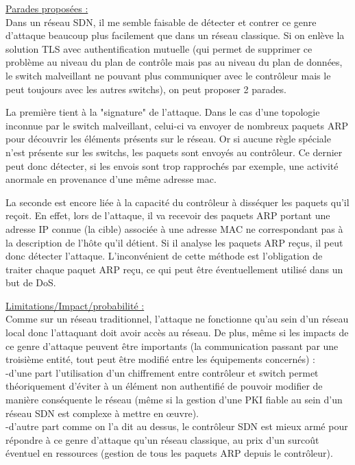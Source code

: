 \underline{Parades proposées :}\\
Dans un réseau SDN, il me semble faisable de détecter et contrer ce genre d'attaque beaucoup plus facilement que dans un réseau classique. Si on enlève la solution TLS avec authentification mutuelle (qui permet de supprimer ce problème au niveau du plan de contrôle mais pas au niveau du plan de données, le switch malveillant ne pouvant plus communiquer avec le contrôleur mais le peut toujours avec les autres switchs), on peut proposer 2 parades.

La première tient à la "signature" de l'attaque. Dans le cas d'une topologie inconnue par le switch malveillant, celui-ci va envoyer de nombreux paquets ARP pour découvrir les éléments présents sur le réseau. Or si aucune règle spéciale n'est présente sur les switchs, les paquets sont envoyés au contrôleur. Ce dernier peut donc détecter, si les envois sont trop rapprochés par exemple, une activité anormale en provenance d'une même adresse mac.

La seconde est encore liée à la capacité du contrôleur à disséquer les paquets qu'il reçoit. En effet, lors de l'attaque, il va recevoir des paquets ARP portant une adresse IP connue (la cible) associée à une adresse MAC ne correspondant pas à la description de l'hôte qu'il détient. Si il analyse les paquets ARP reçus, il peut donc détecter l'attaque. L'inconvénient de cette méthode est l'obligation de traiter chaque paquet ARP reçu, ce qui peut être éventuellement utilisé dans un but de DoS.

\underline{Limitations/Impact/probabilité :}\\
Comme sur un réseau traditionnel, l’attaque ne fonctionne qu’au sein d’un réseau local donc l’attaquant doit avoir accès au réseau. De plus, même si les impacts de ce genre d’attaque peuvent être importants (la communication passant par une troisième entité, tout peut être modifié entre les équipements concernés) :\\
-d’une part l’utilisation d’un chiffrement entre contrôleur et switch permet théoriquement d’éviter à un élément non authentifié de pouvoir modifier de manière conséquente le réseau (même si la gestion d’une PKI fiable au sein d’un réseau SDN est complexe à mettre en œuvre).\\
-d’autre part comme on l'a dit au dessus, le contrôleur SDN est mieux armé pour répondre à ce genre d’attaque qu’un réseau classique, au prix d'un surcoût éventuel en ressources (gestion de tous les paquets ARP depuis le contrôleur).